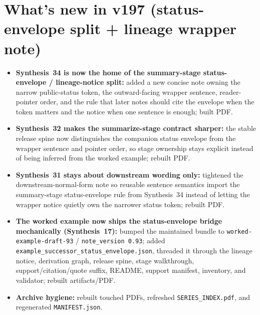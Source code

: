 \documentclass[11pt]{article}
\begin{document}
\section{What's new in v197 (status-envelope split + lineage wrapper note)}
\begin{itemize}[leftmargin=*]
\item \textbf{Synthesis~34 is now the home of the summary-stage status-envelope / lineage-notice split:} added a new concise note owning the narrow public-status token, the outward-facing wrapper sentence, reader-pointer order, and the rule that later notes should cite the envelope when the token matters and the notice when one sentence is enough; built PDF.
\item \textbf{Synthesis~32 makes the summarize-stage contract sharper:} the stable release spine now distinguishes the companion status envelope from the wrapper sentence and pointer order, so stage ownership stays explicit instead of being inferred from the worked example; rebuilt PDF.
\item \textbf{Synthesis~31 stays about downstream wording only:} tightened the downstream-normal-form note so reusable sentence semantics import the summary-stage status-envelope rule from Synthesis~34 instead of letting the wrapper notice quietly own the narrower status token; rebuilt PDF.
\item \textbf{The worked example now ships the status-envelope bridge mechanically (Synthesis~17):} bumped the maintained bundle to \texttt{worked-example-draft-93} / \texttt{note\_version 0.93}; added \texttt{example\_successor\_status\_envelope.json}, threaded it through the lineage notice, derivation graph, release spine, stage walkthrough, support/citation/quote suffix, README, support manifest, inventory, and validator; rebuilt artifacts/PDF.
\item \textbf{Archive hygiene:} rebuilt touched PDFs, refreshed \texttt{SERIES\_INDEX.pdf}, and regenerated \texttt{MANIFEST.json}.
\end{itemize}
\end{document}
